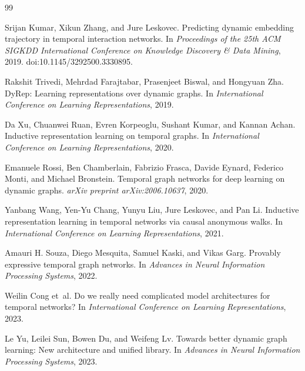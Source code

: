 \begin{thebibliography}{99}

Srijan Kumar, Xikun Zhang, and Jure Leskovec.
\newblock Predicting dynamic embedding trajectory in temporal interaction networks.
\newblock In \emph{Proceedings of the 25th ACM SIGKDD International Conference on Knowledge Discovery \& Data Mining}, 2019.
\newblock doi:10.1145/3292500.3330895.

Rakshit Trivedi, Mehrdad Farajtabar, Prasenjeet Biswal, and Hongyuan Zha.
\newblock DyRep: Learning representations over dynamic graphs.
\newblock In \emph{International Conference on Learning Representations}, 2019.

Da Xu, Chuanwei Ruan, Evren Korpeoglu, Sushant Kumar, and Kannan Achan.
\newblock Inductive representation learning on temporal graphs.
\newblock In \emph{International Conference on Learning Representations}, 2020.

Emanuele Rossi, Ben Chamberlain, Fabrizio Frasca, Davide Eynard, Federico Monti, and Michael Bronstein.
\newblock Temporal graph networks for deep learning on dynamic graphs.
\newblock \emph{arXiv preprint arXiv:2006.10637}, 2020.

Yanbang Wang, Yen-Yu Chang, Yunyu Liu, Jure Leskovec, and Pan Li.
\newblock Inductive representation learning in temporal networks via causal anonymous walks.
\newblock In \emph{International Conference on Learning Representations}, 2021.

Amauri H. Souza, Diego Mesquita, Samuel Kaski, and Vikas Garg.
\newblock Provably expressive temporal graph networks.
\newblock In \emph{Advances in Neural Information Processing Systems}, 2022.

Weilin Cong et~al.
\newblock Do we really need complicated model architectures for temporal networks?
\newblock In \emph{International Conference on Learning Representations}, 2023.

Le Yu, Leilei Sun, Bowen Du, and Weifeng Lv.
\newblock Towards better dynamic graph learning: New architecture and unified library.
\newblock In \emph{Advances in Neural Information Processing Systems}, 2023.


\end{thebibliography}
